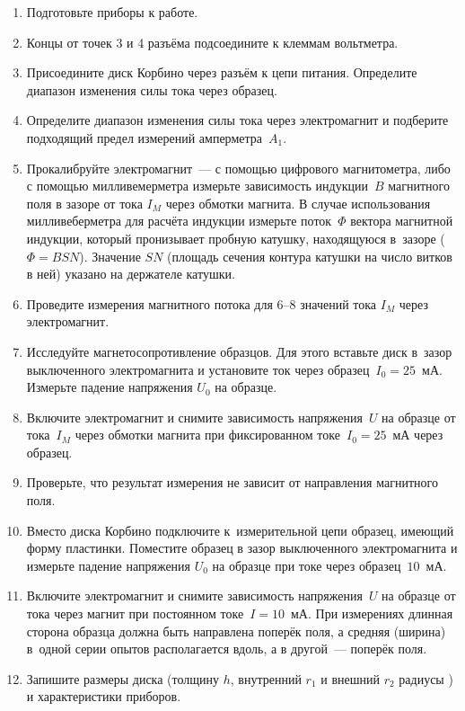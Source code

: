 \begin{enumerate}

\item{ Подготовьте приборы к работе.}

\item{ Концы от точек 3 и 4 разъёма подсоедините к клеммам вольтметра.}

\item{ Присоедините диск Корбино через разъём к цепи питания. Определите диапазон изменения силы тока через образец.}

\item{ Определите диапазон изменения силы тока через электромагнит и подберите подходящий предел измерений амперметра~$A_1$.}

\item{ Прокалибруйте электромагнит~--- с помощью цифрового магнитометра, либо с помощью милливемерметра измерьте зависимость  индукции~$B$ магнитного поля в зазоре от тока $I_M$ через обмотки магнита. В случае использования милливеберметра для расчёта индукции измерьте поток~$\Phi$ вектора магнитной индукции, который пронизывает пробную катушку, находящуюся в~зазоре ($\Phi=BSN$). Значение $SN$ (площадь сечения контура катушки на число витков в ней) указано на держателе катушки.}

\item{ Проведите измерения магнитного потока для 6--8 значений тока $I_M$ через электромагнит.}

\item{ Исследуйте магнетосопротивление образцов. Для этого вставьте диск в~зазор выключенного электромагнита и установите ток через образец~$I_0=25$~мА. Измерьте падение напряжения $U_0$ на образце.}

\item{ Включите электромагнит и снимите зависимость напряжения~$U$ на образце от тока~$I_M$ через обмотки магнита при фиксированном токе~$I_0=25$~мА через образец.}

\item{ Проверьте, что результат измерения не зависит от направления магнитного поля.}

\item{ Вместо диска Корбино подключите к~измерительной цепи образец, имеющий форму пластинки. Поместите образец в зазор выключенного электромагнита и измерьте падение напряжения $U_0$ на образце при токе через образец~$10$~мА.}

\item{ Включите электромагнит и снимите зависимость напряжения~$U$ на образце от тока через магнит при постоянном токе~$I=10$~мА. При измерениях длинная сторона образца должна быть направлена поперёк поля, а средняя (ширина) в~одной серии опытов располагается вдоль, а в другой~--- поперёк поля.}

\item{ Запишите размеры диска (толщину $h$, внутренний $r_1$ и внешний $r_2$ радиусы ) и характеристики приборов.}
\end{enumerate}

